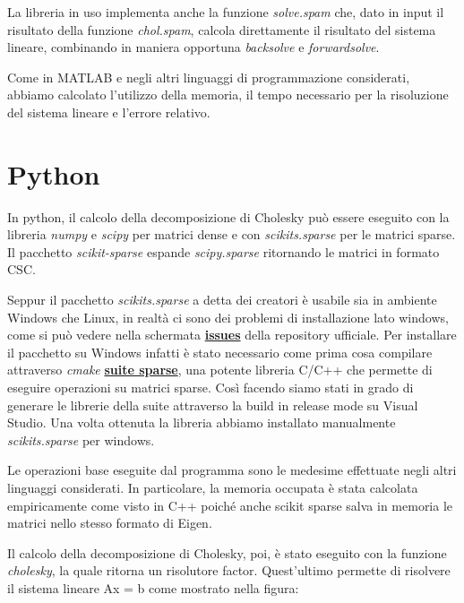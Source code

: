 \documentclass[a4paper,12pt]{article}
\begin{document}
\noindent La libreria in uso implementa anche la funzione \textit{solve.spam} che, dato in input il risultato della funzione \textit{chol.spam}, calcola direttamente il risultato del sistema lineare, combinando in maniera opportuna \textit{backsolve} e \textit{forwardsolve}.
\bigskip

\noindent Come in MATLAB e negli altri linguaggi di programmazione considerati, abbiamo calcolato l’utilizzo della memoria, il tempo necessario per la risoluzione del sistema lineare e l’errore relativo. 

\newpage

\section{Python}
In python, il calcolo della decomposizione di Cholesky può essere eseguito con la libreria \textit{numpy} e \textit{scipy} per matrici dense e con \textit{scikits.sparse} per le matrici sparse. Il pacchetto \textit{scikit-sparse} espande \textit{scipy.sparse} ritornando le matrici in formato CSC.
\bigskip

\noindent Seppur il pacchetto \textit{scikits.sparse} a detta dei creatori è usabile sia in ambiente Windows che Linux, in realtà ci sono dei problemi di installazione lato windows, come si può vedere nella schermata \href{https://github.com/scikit-sparse/scikit-sparse/issues}{\textbf{issues}} della repository ufficiale. Per installare il pacchetto su Windows infatti è stato necessario come prima cosa compilare attraverso \textit{cmake} \href{https://github.com/DrTimothyAldenDavis/SuiteSparse}{\textbf{suite sparse}}, una potente libreria C/C++ che permette di eseguire operazioni su matrici sparse. Così facendo siamo stati in grado di generare le librerie della suite attraverso la build in release mode su Visual Studio. Una volta ottenuta la libreria abbiamo installato manualmente \textit{scikits.sparse} per windows.
\bigskip

\noindent Le operazioni base eseguite dal programma sono le medesime effettuate negli altri linguaggi considerati. In particolare, la memoria occupata è stata calcolata empiricamente come visto in C++ poiché anche scikit sparse salva in memoria le matrici nello stesso formato di Eigen. 
\bigskip

\noindent Il calcolo della decomposizione di Cholesky, poi, è stato eseguito con la funzione \textit{cholesky}, la quale ritorna un risolutore factor. Quest’ultimo permette di risolvere il sistema lineare Ax = b come mostrato nella figura:
\bigskip
\end{document}

